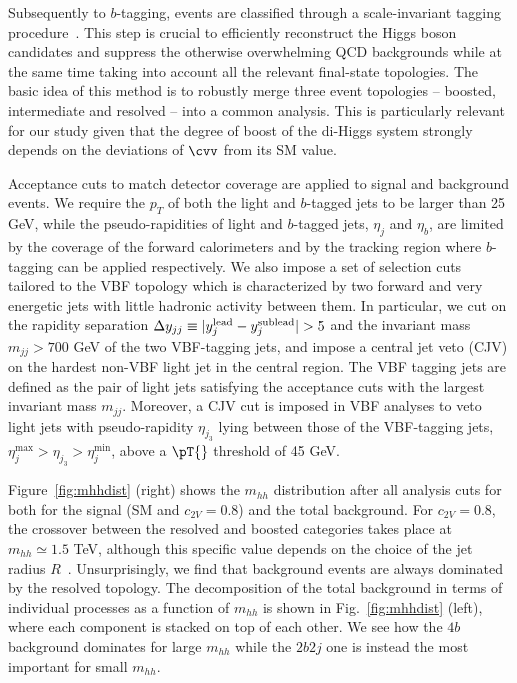 Subsequently to $b$-tagging, events are
classified through a scale-invariant tagging procedure~\cite{Gouzevitch:2013qca,Behr:2015oqq}.
%
This step is crucial to efficiently reconstruct the Higgs boson candidates and
suppress the otherwise overwhelming QCD backgrounds while at the same time
taking into account all the relevant final-state topologies.
%
The basic idea of this method is to robustly merge three event
topologies -- { boosted, intermediate} and { resolved} --
into a common analysis.
%
This is
particularly relevant for our study given that
the degree of boost of the di-Higgs
system strongly depends
on the deviations of $\cvv$ from its SM value.

Acceptance cuts to match detector coverage are applied to signal and background events.
%
We require the $p_T$ of both the light and $b$-tagged jets
to be larger than 25 GeV, while 
the pseudo-rapidities of light
and $b$-tagged jets, $\eta_j$
and $\eta_b$, are limited
by the coverage of the forward calorimeters and
by the tracking region where $b$-tagging can be applied
respectively.
%
We also impose a set of selection cuts tailored
to the VBF topology which is characterized by two forward and very energetic
jets with little hadronic activity between them. In particular, we cut on the
rapidity separation $\Delta y_{jj}\equiv|y_j^{\rm lead}-y_j^{\rm sublead}|>5$ and
the invariant mass $m_{jj}>700$ GeV of the two VBF-tagging jets, and impose a central
jet veto (CJV) on  the hardest non-VBF light jet in the central region. The VBF
tagging jets are defined as the pair of light jets satisfying the acceptance
cuts with the largest invariant mass $m_{jj}$.
%
Moreover, a CJV cut  is imposed  in VBF analyses to veto light
jets with pseudo-rapidity $\eta_{j_3}$ lying between those of the VBF-tagging
jets, $\eta_j^{\max}>\eta_{j_3}>\eta_j^{\min}$, above a $\pT{}$ threshold of 45 GeV.

Figure~\ref{fig:mhhdist} (right) shows the $m_{hh}$ distribution
after all analysis cuts for both
for the signal (SM and $c_{2V}=0.8$) and the total background.
%
For $c_{2V}=0.8$, the crossover between the resolved and
boosted categories takes place
at $m_{hh}\simeq 1.5$ TeV,
although this specific value depends on the choice of the jet
radius $R$~\cite{Gouzevitch:2013qca}.
%
Unsurprisingly, we find that
background events are always dominated by the resolved topology.
%
The decomposition of the total background in terms of individual processes as a
function of $m_{hh}$ is shown in Fig.~\ref{fig:mhhdist} (left),
where each component is
stacked on top of each other. We see how the $4b$ background dominates
for large $m_{hh}$ while the $2b2j$ one is instead the most important for small
$m_{hh}$. 

